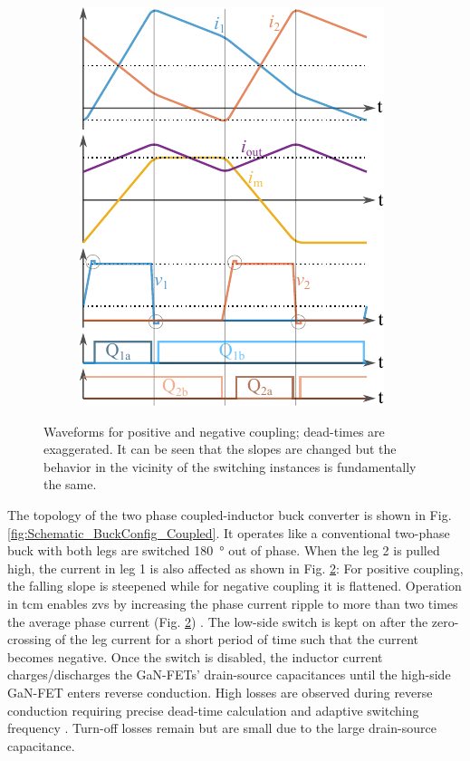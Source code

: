 \documentclass{IPEC2026}
\newcommand{\ac}{\gls}
\begin{document}
\begin{figure}
\begin{subfigure}[c]{0.48\columnwidth}
      \includegraphics[width=\textwidth]{figures/Inkscape/Waveforms_positive.pdf}
      \label{fig:waveform_posCoupling}
    \end{subfigure}
  \caption{Waveforms for positive and negative coupling; dead-times are exaggerated. It can be seen that the slopes are changed but the behavior in the vicinity of the switching instances is fundamentally the same.}
  \label{fig:waveform_Coupling}
\end{figure}
The topology of the two phase coupled-inductor buck converter is shown in Fig. \ref{fig:Schematic_BuckConfig_Coupled}. It operates like a conventional two-phase buck with both legs are switched \qty{180}{\degree} out of phase. When the leg 2 is pulled high, the current in leg 1 is also affected as shown in Fig. \ref{fig:waveform_Coupling}: For positive coupling, the falling slope is steepened while for negative coupling it is flattened. 
Operation in \ac{tcm} enables \ac{zvs} by increasing the phase current ripple to more than two times the average phase current (Fig. \ref{fig:waveform_Coupling}) \cite{henzeZerovoltageSwitchingHigh1988}. The low-side switch is kept on after the zero-crossing of the leg current for a short period of time such that the current becomes negative. Once the switch is disabled, the inductor current charges/discharges the GaN-FETs' drain-source capacitances until the high-side GaN-FET enters reverse conduction. High losses are observed during reverse conduction requiring precise dead-time calculation and adaptive switching frequency \cite{haiderAnalyticalCalculationResidual2021}. Turn-off losses remain but are small due to the large drain-source capacitance. 
\end{document}
